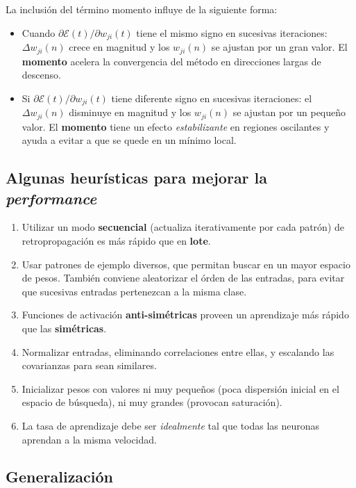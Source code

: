 \documentclass[10pt,a4paper]{article}
\begin{document}
La inclusión del término momento influye de la siguiente forma:
\begin{itemize}
\item Cuando $\partial \mathcal{E} (t) / \partial w_{ji}(t)$ tiene el mismo signo en sucesivas iteraciones: $\Delta w_{ji}(n)$ crece en magnitud y los $w_{ji}(n)$ se ajustan por un gran valor. El \textbf{momento} acelera la convergencia del método en direcciones largas de descenso.
\item Si $\partial \mathcal{E} (t) / \partial w_{ji}(t)$ tiene diferente signo en sucesivas iteraciones: el $\Delta w_{ji}(n)$ disminuye en magnitud y los $w_{ji}(n)$ se ajustan por un pequeño valor. El \textbf{momento} tiene un efecto \textit{estabilizante} en regiones oscilantes y ayuda a evitar a que se quede en un mínimo local.
\end{itemize}

\subsection{Algunas heurísticas para mejorar la \textit{performance}}

\begin{enumerate}
\item Utilizar un modo \textbf{secuencial} (actualiza iterativamente por cada patrón) de retropropagación es más rápido que en \textbf{lote}.
\item Usar patrones de ejemplo diversos, que permitan buscar en un mayor espacio de pesos. También conviene aleatorizar el órden de las entradas, para evitar que sucesivas entradas pertenezcan a la misma clase.
\item Funciones de activación \textbf{anti-simétricas} proveen un aprendizaje más rápido que las \textbf{simétricas}.
\item Normalizar entradas, eliminando correlaciones entre ellas, y escalando las covarianzas para sean similares.
\item Inicializar pesos con valores ni muy pequeños (poca dispersión inicial en el espacio de búsqueda), ni muy grandes (provocan saturación).
\item La tasa de aprendizaje debe ser \textit{idealmente} tal que todas las neuronas aprendan a la misma velocidad.
\end{enumerate}

\subsection{Generalización}
\end{document}
